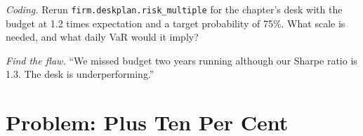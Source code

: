 \begin{exercise}[$\star\star\star$]\label{exo:fm:the-head-of-desks-job:7}
\emph{Coding.} Rerun \texttt{firm.deskplan.risk\_multiple} for the chapter's desk with the budget at 1.2 times expectation and a target
probability of 75\%. What scale is needed, and what daily VaR would it imply?
\end{exercise}

\begin{exercise}[$\star\star\star$]\label{exo:fm:the-head-of-desks-job:8}
\emph{Find the flaw.} ``We missed budget two years running although our Sharpe ratio is 1.3. The desk is underperforming.''
\end{exercise}

\section{Problem: Plus Ten Per Cent}

